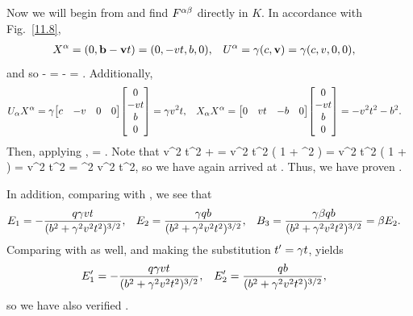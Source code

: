\begin{solution}
	Now we will begin from  and find $F^{\alpha \beta}$ directly in $K$.  In accordance with Fig.~\ref{11.8},
	\begin{align*}
		X^\alpha &= (0, \vb{b} - \vb{v} t) = (0, -v t, b, 0), &
		U^\alpha &= \gamma (c, \vb{v}) = \gamma (c, v, 0, 0),
	\end{align*}
	and so
	\beq
		\Xa \Ub - \Xb \Ua = \gam
			\mqty[ 0 & 0 & 0 & 0 \\
				-c v t & -v^2 t & 0 & 0 \\
				c b & v b & 0 & 0 \\
				0 & 0 & 0 & 0 ]
		- \gam
			\mqty[ 0 & -c v t & c b & 0 \\
				0 & -v^2 t & v b & 0 \\
				0 & 0 & 0 & 0 \\
				0 & 0 & 0 & 0 ]
		= \gam
			\mqty[0 & c v t & - c b & 0 \\
				-c v t & 0 & -v b & 0 \\
				c b & v b & 0 & 0 \\
				0 & 0 & 0 & 0 ].
	\eeq
	Additionally,
	\begin{align*}
		\Usa \Xa &= \gam \mqty[ c & -v & 0 & 0 ] \mqty[ 0 \\ -v t \\ b \\ 0 ]
		= \gam v^2 t, &
		\Xsa \Xa &= \mqty[ 0 & vt & -b & 0 ] \mqty[ 0 \\ -v t \\ b \\ 0 ]
		= -v^2 t^2 - b^2.
	\end{align*}
	Then, applying ,
	\beq
		\Fab = 
			\mqty[0 & v t & -b & 0 \\
				-v t & 0 & -v b / c & 0 \\
				b & v b / c & 0 & 0 \\
				0 & 0 & 0 & 0 ].
	\eeq
	Note that
	\beq
		v^2 t^2 +  = v^2 t^2 \left( 1 + \gam^2  \right)
		= v^2 t^2 \left( 1 +  \right)
		= v^2 t^2 
		= \gam^2 v^2 t^2,
	\eeq
	so we have again arrived at .  Thus, we have proven .
	
	In addition, comparing  with , we see that
	\begin{align*}
		E_1 &= -\frac{q \gamma v t}{(b^2 + \gamma^2 v^2 t^2)^{3/2}}, &
		E_2 &= \frac{\gamma q b}{(b^2 + \gamma^2 v^2 t^2)^{3/2}}, &
		B_3 &= \frac{\gamma \beta q b}{(b^2 + \gamma^2 v^2 t^2)^{3/2}} = \beta E_2.
	\end{align*}
	Comparing  with  as well, and making the substitution $t' = \gamma t$, yields
	\begin{align*}
		E_1' &= -\frac{q \gamma v t}{(b^2 + \gamma^2 v^2 t^2)^{3/2}}, &
		E_2' &= \frac{q b}{(b^2 + \gamma^2 v^2 t^2)^{3/2}},
	\end{align*}
	so we have also verified .
\end{solution}


